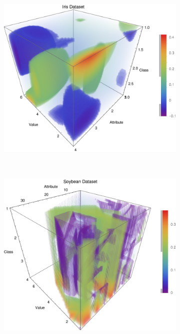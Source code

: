 \documentclass{article}
\begin{document}
\begin{figure}[h]
\begin{subfigure}[b]{0.49\textwidth}
				\end{subfigure} \	
				\begin{subfigure}[b]{0.49\textwidth}
					\centering
					\includegraphics[width=\textwidth]{figs/NaiveBayes/plot_ptable_iris}					
				\end{subfigure} \	
				\begin{subfigure}[b]{0.49\textwidth}
					\centering
					\includegraphics[width=\textwidth]{figs/NaiveBayes/plot_ptable_soybean}					

\end{subfigure}
\end{figure}
\end{document}
